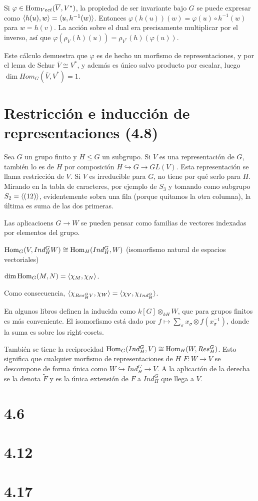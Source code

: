\documentclass[ANAyTR.tex]{subfiles}
\begin{document}
Si $\varphi\in\operatorname{Hom}_{Vect}(\overline{V},V^*)$, la propiedad de ser invariante bajo $G$ se puede expresar como $\langle{h(u),w}\rangle=\langle{u,h^{-1}(w)}\rangle$. Entonces $\varphi(h(u))(w)=\varphi(u)\circ h^{-1}(w)$ para $w=h(v)$.  La acción sobre el dual era precisamente multiplicar por el inverso, así que $\varphi(\rho_V(h)(u))=\rho_{V^*}(h)(\varphi(u))$. 

Este cálculo demuestra que $\varphi$ es de hecho un morfismo de representaciones, y por el lema de Schur $\overline{V}\cong V^*$, y además es único salvo producto por escalar, luego $\dim Hom_G(\overline{V},V^*)=1$. 

\section{Restricción e inducción de representaciones (4.8)}
Sea $G$ un grupo finito y $H\leq G$ un subgrupo. Si $V$ es una representación de $G$, también lo es de $H$ por composición $H\hookrightarrow G\to GL(V)$. Esta representación se llama restricción de $V$. Si $V$ es irreducible para $G$, no tiene por qué serlo para $H$. Mirando en la tabla de caracteres, por ejemplo de $S_3$ y tomando como subgrupo $S_2=\langle{(12)}\rangle$, evidentemente sobra una fila (porque quitamos la otra columna), la última es suma de las dos primeras. 

Las aplicacioens $G\to W$ se pueden pensar como familias de vectores indexadas por elementos del grupo. 


\begin{teorema}
$\operatorname{Hom}_G(V,Ind^G_HW)\cong \operatorname{Hom}_H(Ind^G_H,W)$ (isomorfismo natural de espacios vectoriales)
\end{teorema}
$\dim \operatorname{Hom}_G(M,N)=\langle{\chi_M,\chi_N}\rangle$. 

Como consecuencia, $\langle{\chi_{Res^G_H V},\chi_W}\rangle=\langle{\chi_V,\chi_{Ind^G_H}}\rangle$. 

En algunos libros definen la inducida como $k[G]\otimes_{kH}W$, que para grupos finitos es más conveniente. El isomorfismo está dado por $f\mapsto \sum_{\sigma} x_\sigma\otimes f(x_\sigma^{-1})$, donde la suma es sobre los right-cosets.
 
 
 También se tiene la reciprocidad $\operatorname{Hom}_G(Ind^G_H,V)\cong\operatorname{Hom}_H(W,Res^G_H)$. Esto significa que cualquier morfismo de representaciones de $H$ $F:W\to V$ se descompone de forma única como $W\hookrightarrow Ind^G_H \to V$. A la aplicación de la derecha se la denota $\tilde{F}$ y es la única extensión de $F$ a $Ind^G_H$ que llega a $V$. 
\section{4.6}

\section{4.12}

\section{4.17}
\end{document}
